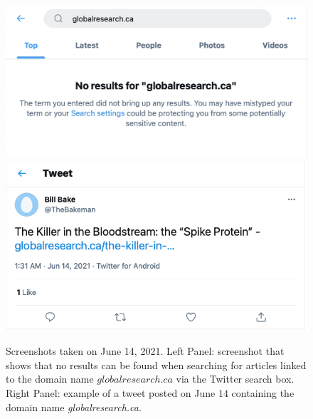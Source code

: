 \documentclass{article}
\begin{document}
\begin{figure}[h]
	\centering
					\includegraphics[scale=0.35]{./img/globalresearch_14_06_2021_16pm_UTC.png} 
					\includegraphics[scale=0.32]{./img/globalresearch/tweet.png} 
		\caption{Screenshots taken on June 14, 2021. Left Panel: screenshot that shows that no results can be found when searching for articles linked to the domain name $globalresearch.ca$ via the Twitter search box. Right Panel: example of a tweet posted on June $14$ containing the domain name {\it globalresearch.ca}. }
		\label{fig3}
\end{figure}
\end{document}
